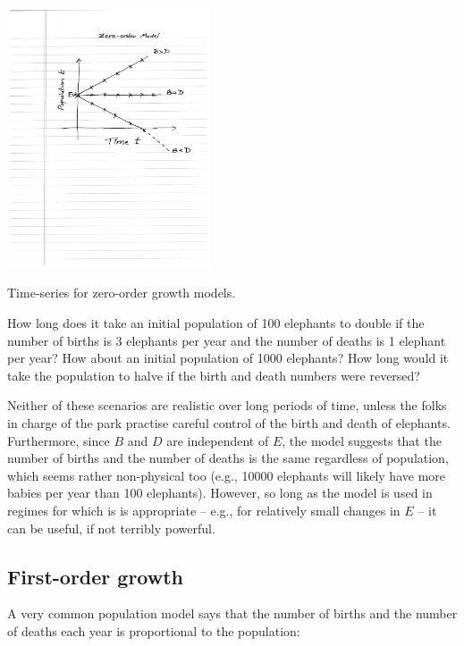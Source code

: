 \begin{marginfigure}
\includegraphics[width=6cm]{figs/zero_order}
\caption{Time-series for zero-order growth models. }
\end{marginfigure}

\begin{del}
How long does it take an initial population of 100 elephants to double if the number of births is 3 elephants per year and the number of deaths is 1 elephant per year? How about an initial population of 1000 elephants? How long would it take the population to halve if the birth and death numbers were reversed?
\end{del}

Neither of these scenarios are realistic over long periods of time, unless the folks in charge of the park practise careful control of the birth and death of elephants. Furthermore, since $B$ and $D$ are independent of $E$, the model suggests that the number of births and the number of deaths is the same regardless of population, which seems rather non-physical too (e.g., 10000 elephants will likely have more babies per year than 100 elephants). However, so long as the model is used in regimes for which is is appropriate -- e.g., for relatively small changes in $E$ -- it can be useful, if not terribly powerful.


\subsection{First-order growth}

A very common population model says that the number of births and the number of deaths each year is proportional to the population:

